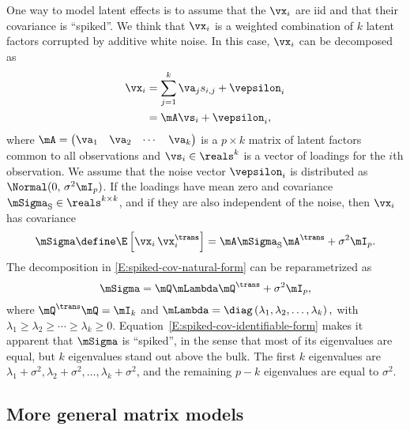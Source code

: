 One way to model latent effects is to assume that the $\vx_i$ are iid and
that their covariance is ``spiked''. We think that $\vx_i$ is a weighted
combination of $k$ latent factors corrupted by additive white noise. In this
case, $\vx_i$ can be decomposed as
\begin{align}
    \vx_i
        &=
        \sum_{j=1}^k
            \va_j
            s_{i,j}
        +
        \vepsilon_i \notag \\
        &=
        \mA \vs_i + \vepsilon_i,
\end{align}
where
\(
    \mA
    =
    \left(
    \begin{matrix}
        \va_1 & \va_2 & \cdots & \va_k
    \end{matrix}
    \right)
\)
is a $p \times k$ matrix of latent factors common to all observations and
$\vs_i \in \reals^{k}$ is a vector of loadings for the $i$th observation. We assume that the
noise vector $\vepsilon_i$ is distributed as $\Normal( 0, \, \sigma^2 \mI_p
)$. If the loadings have mean zero and covariance $\mSigma_\text{S} \in
\reals^{k \times k}$, and if they are also independent of the noise, then
$\vx_i$ has covariance
\begin{equation}\label{E:spiked-cov-natural-form}
    \mSigma
        \define
        \E \left[ \vx_i \, \vx_i^\trans \right]
            =
                \mA \mSigma_\text{S} \mA^\trans
                +
                \sigma^2
                \mI_p.
\end{equation}
The decomposition in \eqref{E:spiked-cov-natural-form} can be reparametrized
as
\begin{equation}\label{E:spiked-cov-identifiable-form}
    \mSigma
        =
        \mQ \mLambda \mQ^\trans
        +
        \sigma^2
        \mI_p,
\end{equation}
where $\mQ^\trans \mQ = \mI_k$ and
\(
    \mLambda
        = 
        \diag \left( \lambda_1, \lambda_2, \ldots, \lambda_k \right),
\)
with $\lambda_1 \geq \lambda_2 \geq \cdots \geq \lambda_k \geq 0$.
Equation~\eqref{E:spiked-cov-identifiable-form} makes it apparent that
$\mSigma$ is ``spiked'', in the sense that most of its eigenvalues are equal,
but $k$ eigenvalues stand out above the bulk. The first $k$ eigenvalues are
$\lambda_1 + \sigma^2, \lambda_2 + \sigma^2, \ldots, \lambda_k + \sigma^2$,
and the remaining $p-k$ eigenvalues are equal to $\sigma^2$.

\subsection{More general matrix models}

